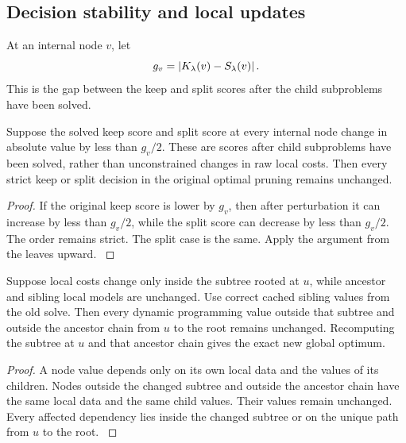 \subsection{Decision stability and local updates}\label{main:subsection:015}

\begin{definition}\label{main:definition:013}\label{def:decision_gap}
At an internal node \(v\), let
\[
g_v
=
\left\lvert K_\lambda(v)-S_\lambda(v)\right\rvert.
\]
This is the gap between the keep and split scores after the child subproblems have been solved.
\end{definition}

\begin{theorem}\label{main:theorem:025}\label{thm:compiler_stability}
Suppose the solved keep score and split score at every internal node change in absolute value by less than $g_v/2$. These are scores after child subproblems have been solved, rather than unconstrained changes in raw local costs. Then every strict keep or split decision in the original optimal pruning remains unchanged.
\end{theorem}

\begin{proof}\label{main:proof:049}
If the original keep score is lower by \(g_v\), then after perturbation it can increase by less than \(g_v/2\), while the split score can decrease by less than \(g_v/2\). The order remains strict. The split case is the same. Apply the argument from the leaves upward.
\label{main:proof:049:end}\end{proof}

\begin{theorem}\label{main:theorem:026}\label{thm:local_recompilation}
Suppose local costs change only inside the subtree rooted at $u$, while ancestor and sibling local models are unchanged. Use correct cached sibling values from the old solve. Then every dynamic programming value outside that subtree and outside the ancestor chain from \(u\) to the root remains unchanged. Recomputing the subtree at \(u\) and that ancestor chain gives the exact new global optimum.
\end{theorem}

\begin{proof}\label{main:proof:050}
A node value depends only on its own local data and the values of its children. Nodes outside the changed subtree and outside the ancestor chain have the same local data and the same child values. Their values remain unchanged. Every affected dependency lies inside the changed subtree or on the unique path from \(u\) to the root.
\label{main:proof:050:end}\end{proof}

